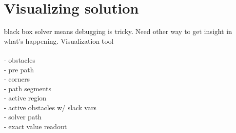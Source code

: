 \section{Visualizing solution}
\label{section:visual}
black box solver means debugging is tricky. Need other way to get insight in what's happening. Visualization tool \\ \\

- obstacles \\
- pre path \\
- corners \\
- path segments\\
- active region\\
- active obstacles w/ slack vars\\
- solver path\\
- exact value readout \\